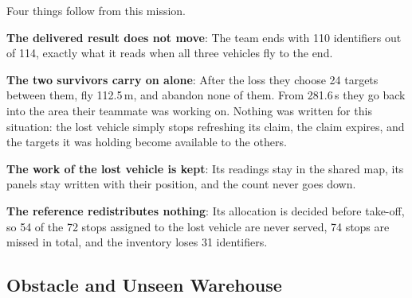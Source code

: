 Four things follow from this mission.

\textbf{The delivered result does not move}: The team ends with 110 identifiers
out of 114, exactly what it reads when all three vehicles fly to the end.

\textbf{The two survivors carry on alone}: After the loss they choose 24 targets
between them, fly 112.5\,m, and abandon none of them. From 281.6\,s they go back
into the area their teammate was working on. Nothing was written for this
situation: the lost vehicle simply stops refreshing its claim, the claim expires,
and the targets it was holding become available to the others.

\textbf{The work of the lost vehicle is kept}: Its readings stay in the shared
map, its panels stay written with their position, and the count never goes down.

\textbf{The reference redistributes nothing}: Its allocation is decided before
take-off, so 54 of the 72 stops assigned to the lost vehicle are never served, 74
stops are missed in total, and the inventory loses 31 identifiers.

\subsection{Obstacle and Unseen Warehouse}%
\label{subsec:impl:obstacle}

